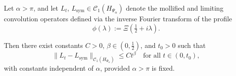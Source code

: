 \begin{lemma}
\label{lem:trace_norm_rate_convergence}
Let \( \alpha > \pi \), and let \( L_t \), \( L_{\mathrm{sym}} \in \mathcal{C}_1(H_{\Psi_\alpha}) \) denote the mollified and limiting convolution operators defined via the inverse Fourier transform of the profile
\[
\phi(\lambda) := \Xi\left( \tfrac{1}{2} + i\lambda \right).
\]

Then there exist constants \( C > 0 \), \( \beta \in (0, \tfrac{1}{2}) \), and \( t_0 > 0 \) such that
\[
\| L_t - L_{\mathrm{sym}} \|_{\mathcal{C}_1(H_{\Psi_\alpha})} \le C t^\beta \quad \text{for all } t \in (0, t_0),
\]
with constants independent of \( \alpha \), provided \( \alpha > \pi \) is fixed.
\end{lemma}
% 